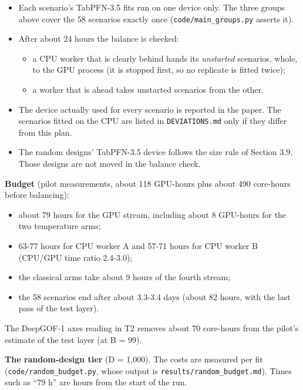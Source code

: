 \documentclass[
  10pt,
]{article}
\providecommand{\tightlist}{%
  \setlength{\itemsep}{0pt}\setlength{\parskip}{0pt}}
\begin{document}
\begin{itemize}
\tightlist
\item
  Each scenario's TabPFN-3.5 fits run on one device only.
  The three groups above cover the 58 scenarios exactly once
  (\texttt{code/main\_groups.py} asserts it).
\item
  After about 24 hours the balance is checked:

  \begin{itemize}
  \tightlist
  \item
    a CPU worker that is clearly behind hands its
    \emph{unstarted} scenarios, whole, to the GPU process
    (it is stopped first, so no replicate is fitted twice);
  \item
    a worker that is ahead takes unstarted scenarios from
    the other.
  \end{itemize}
\item
  The device actually used for every scenario is reported in
  the paper. The scenarios fitted on the CPU are listed in
  \texttt{DEVIATIONS.md} only if they differ from this plan.
\item
  The random designs' TabPFN-3.5 device follows the size
  rule of Section 3.9. Those designs are not moved in the
  balance check.
\end{itemize}

\textbf{Budget} (pilot measurements, about 118 GPU-hours
plus about 490 core-hours before balancing):

\begin{itemize}
\tightlist
\item
  about 79 hours for the GPU stream, including about 8
  GPU-hours for the two temperature arms;
\item
  63-77 hours for CPU worker A and 57-71 hours for CPU
  worker B (CPU/GPU time ratio 2.4-3.0);
\item
  the classical arms take about 9 hours of the fourth
  stream;
\item
  the 58 scenarios end after about 3.3-3.4 days (about 82
  hours, with the last pass of the test layer).
\end{itemize}

The DeepGOF-1 axes reading in T2 removes about 70 core-hours
from the pilot's estimate of the test layer (at B = 99).

\textbf{The random-design tier} (D = 1,000). The costs are
measured per fit (\texttt{code/random\_budget.py}, whose
output is \texttt{results/random\_budget.md}). Times such as
``79 h'' are hours from the start of the run.
\end{document}
